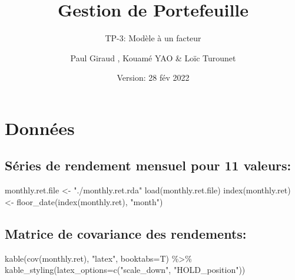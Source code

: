 \documentclass[
]{article}
\title{Gestion de Portefeuille}
\subtitle{TP-3: Modèle à un facteur}
\author{Paul Giraud , Kouamé YAO \& Loïc Turounet}
\date{Version: 28 fév 2022}
\newenvironment{Shaded}{\begin{snugshade}}{\end{snugshade}}
\newcommand{\AttributeTok}[1]{\textcolor[rgb]{0.77,0.63,0.00}{#1}}
\newcommand{\FunctionTok}[1]{\textcolor[rgb]{0.00,0.00,0.00}{#1}}
\newcommand{\NormalTok}[1]{#1}
\newcommand{\OtherTok}[1]{\textcolor[rgb]{0.56,0.35,0.01}{#1}}
\newcommand{\SpecialCharTok}[1]{\textcolor[rgb]{0.00,0.00,0.00}{#1}}
\newcommand{\StringTok}[1]{\textcolor[rgb]{0.31,0.60,0.02}{#1}}
\begin{document}
\maketitle

\hypertarget{donnuxe9es}{%
\section{Données}\label{donnuxe9es}}

\hypertarget{suxe9ries-de-rendement-mensuel-pour-11-valeurs}{%
\subsection{Séries de rendement mensuel pour 11
valeurs:}\label{suxe9ries-de-rendement-mensuel-pour-11-valeurs}}

\begin{Shaded}
\begin{Highlighting}[]
\NormalTok{monthly.ret.file }\OtherTok{\textless{}{-}} \StringTok{"./monthly.ret.rda"}
\FunctionTok{load}\NormalTok{(monthly.ret.file)}
\FunctionTok{index}\NormalTok{(monthly.ret) }\OtherTok{\textless{}{-}} \FunctionTok{floor\_date}\NormalTok{(}\FunctionTok{index}\NormalTok{(monthly.ret), }\StringTok{"month"}\NormalTok{)}
\end{Highlighting}
\end{Shaded}

\hypertarget{matrice-de-covariance-des-rendements}{%
\subsection{Matrice de covariance des
rendements:}\label{matrice-de-covariance-des-rendements}}

\begin{Shaded}
\begin{Highlighting}[]
\FunctionTok{kable}\NormalTok{(}\FunctionTok{cov}\NormalTok{(monthly.ret), }\StringTok{"latex"}\NormalTok{, }\AttributeTok{booktabs=}\NormalTok{T) }\SpecialCharTok{\%\textgreater{}\%}
\FunctionTok{kable\_styling}\NormalTok{(}\AttributeTok{latex\_options=}\FunctionTok{c}\NormalTok{(}\StringTok{"scale\_down"}\NormalTok{, }\StringTok{"HOLD\_position"}\NormalTok{))}
\end{Highlighting}
\end{Shaded}
\end{document}

